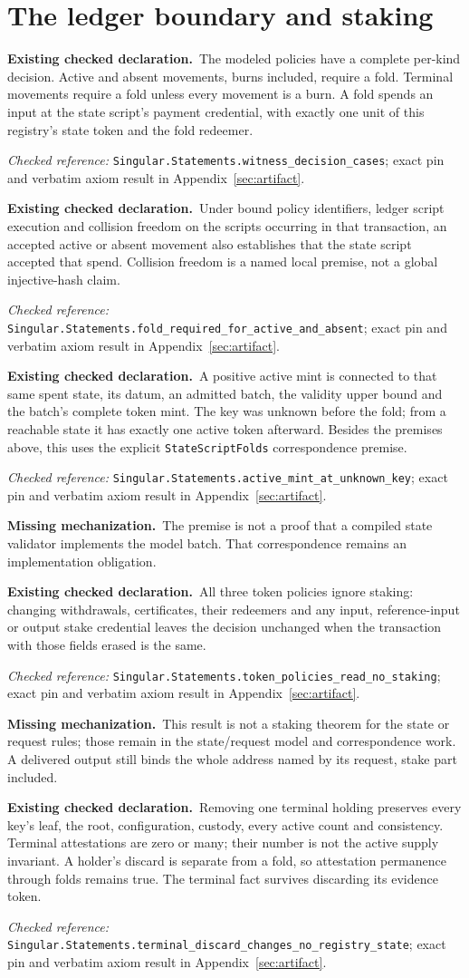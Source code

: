 \documentclass[runningheads]{llncs}
\newcommand{\checked}{\par\noindent\textcolor{green!35!black}{\textbf{Existing checked declaration.}}\ }
\newcommand{\missing}{\par\noindent\textcolor{red!65!black}{\textbf{Missing mechanization.}}\ }
\newcommand{\decl}[1]{\textnormal{\small\nolinkurl{#1}}}
\newcommand{\evidence}[1]{\par\noindent\textit{Checked reference:} \decl{Singular.Statements.#1}; exact pin and verbatim axiom result in Appendix~\ref{sec:artifact}.\par}
\begin{document}
\section{The ledger boundary and staking}
\checked The modeled policies have a complete per-kind decision. Active and
absent movements, burns included, require a fold. Terminal movements require
a fold unless every movement is a burn. A fold spends an input at the state
script's payment credential, with exactly one unit of this registry's state
token and the fold redeemer.
\evidence{witness_decision_cases}
\checked Under bound policy identifiers, ledger script execution and collision
freedom on the scripts occurring in that transaction, an accepted active or
absent movement also establishes that the state script accepted that spend.
Collision freedom is a named local premise, not a global injective-hash claim.
\evidence{fold_required_for_active_and_absent}

\checked A positive active mint is connected to that same spent state, its
datum, an admitted batch, the validity upper bound and the batch's complete
token mint. The key was unknown before the fold; from a reachable state it
has exactly one active token afterward. Besides the premises above, this
uses the explicit \decl{StateScriptFolds} correspondence premise.
\evidence{active_mint_at_unknown_key}
\missing The premise is not a proof that a compiled state validator implements
the model batch. That correspondence remains an implementation obligation.

\checked All three token policies ignore staking: changing withdrawals,
certificates, their redeemers and any input, reference-input or output stake
credential leaves the decision unchanged when the transaction with those
fields erased is the same.
\evidence{token_policies_read_no_staking}
\missing This result is not a staking theorem for the state or request rules;
those remain in the state/request model and correspondence work. A delivered
output still binds the whole address named by its request, stake part included.

\checked Removing one terminal holding preserves every key's leaf, the root,
configuration, custody, every active count and consistency. Terminal
attestations are zero or many; their number is not the active supply invariant.
A holder's discard is separate from a fold, so attestation permanence through
folds remains true. The terminal fact survives discarding its evidence token.
\evidence{terminal_discard_changes_no_registry_state}
\end{document}
